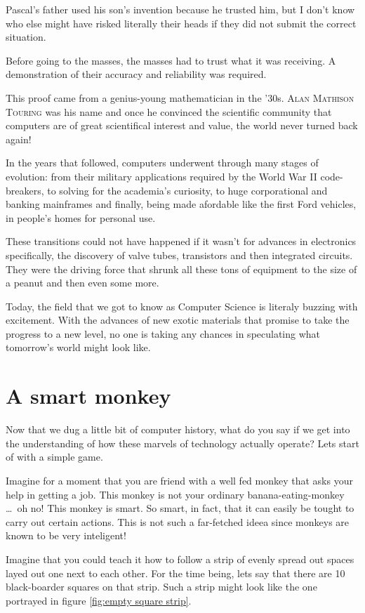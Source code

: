 \documentclass[12pt, a4paper]{book}
\newcommand{\InsertProperName}[1]{
  \textsc{#1}
}
\begin{document}
Pascal's father used his son's invention because he trusted him, but I don't know who else might have risked literally their heads if they did not submit the correct situation. 

Before going to the masses, the masses had to trust what it was receiving. A demonstration of their accuracy and reliability was required.

This proof came from a genius-young mathematician in the '30s. \InsertProperName{Alan Mathison Touring} was his name and once he convinced the scientific community that computers are of great scientifical interest and value, the world never turned back again!

In the years that followed, computers underwent through many stages of evolution: from their military applications required by the World War II code-breakers, to solving for the academia's curiosity, to huge corporational and banking mainframes and finally, being made afordable like the first Ford vehicles, in people's homes for personal use.

These transitions could not have happened if it wasn't for advances in electronics specifically, the discovery of valve tubes, transistors and then integrated circuits. They were the driving force that shrunk all these tons of equipment to the size of a peanut and then even some more.

Today, the field that we got to know as Computer Science is literaly buzzing with excitement. With the advances of new exotic materials that promise to take the progress to a new level, no one is taking any chances in speculating what tomorrow's world might look like.   

\section{A smart monkey}

Now that we dug a little bit of computer history, what do you say if we get into the understanding of how these marvels of technology actually operate? Lets start of with a simple game.

Imagine for a moment that you are friend with a well fed monkey that asks your help in getting a job. This monkey is not your ordinary banana-eating-monkey \ldots\ oh no! This monkey is smart. So smart, in fact, that it can easily be tought to carry out certain actions. This is not such a far-fetched ideea since monkeys are known to be very inteligent!

Imagine that you could teach it how to follow a strip of evenly spread out spaces layed out one next to each other. For the time being, lets say that there are 10 black-boarder squares on that strip. Such a strip might look like the one portrayed in figure \ref{fig:empty square strip}.
\end{document}
